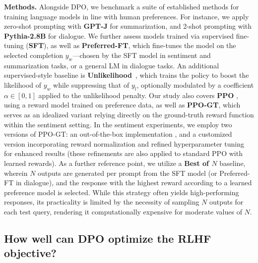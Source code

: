 \textbf{Methods.} Alongside DPO, we benchmark a suite of established methods for training language models in line with human preferences. For instance, we apply zero-shot prompting with \textbf{GPT-J} \citep{gpt-j} for summarization, and 2-shot prompting with \textbf{Pythia-2.8B} \citep{biderman2023pythia} for dialogue. We further assess models trained via supervised fine-tuning (\textbf{SFT}), as well as \textbf{Preferred-FT}, which fine-tunes the model on the selected completion $y_w$—chosen by the SFT model in sentiment and summarization tasks, or a general LM in dialogue tasks. An additional supervised-style baseline is \textbf{Unlikelihood}~\citep{welleck2019neural}, which trains the policy to boost the likelihood of $y_w$ while suppressing that of $y_l$, optionally modulated by a coefficient $\alpha\in[0,1]$ applied to the unlikelihood penalty. Our study also covers \textbf{PPO} \citep{schulman2017proximal}, using a reward model trained on preference data, as well as \textbf{PPO-GT}, which serves as an idealized variant relying directly on the ground-truth reward function within the sentiment setting. In the sentiment experiments, we employ two versions of PPO-GT: an out-of-the-box implementation \cite{leandro_von_werra_2023_7790115}, and a customized version incorporating reward normalization and refined hyperparameter tuning for enhanced results (these refinements are also applied to standard PPO with learned rewards). As a further reference point, we utilize a \textbf{Best of $N$} baseline, wherein $N$ outputs are generated per prompt from the SFT model (or Preferred-FT in dialogue), and the response with the highest reward according to a learned preference model is selected. While this strategy often yields high-performing responses, its practicality is limited by the necessity of sampling $N$ outputs for each test query, rendering it computationally expensive for moderate values of $N$.

\subsection{How well can DPO optimize the RLHF objective?}

